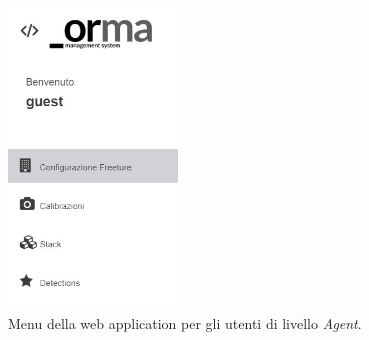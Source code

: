 \begin{figure}
    \begin{center}
    \includegraphics[width=0.4\textwidth]{images/menu-ridotto.jpg}
        \caption{Menu della web application per gli utenti di livello \emph{Agent}.}
        \label{fig:menu-ridotto}
    \end{center}
\end{figure}

